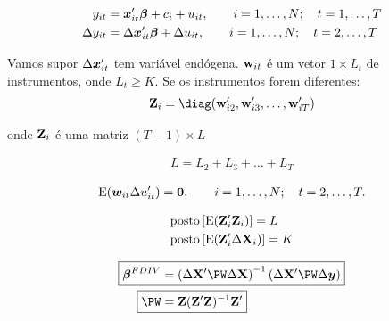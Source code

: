 \documentclass[11pt, oneside, a4paper, article]{article}
\numberwithin{equation}{section}
\begin{document}
\begin{description}
\vspace{-2 em}
\begin{align*}
y_{it} &= \boldsymbol{x}_{it}' \boldsymbol{\beta} + c_{i} + u_{it}, 
\qquad i = 1, \dots, N; \quad t = 1, \dots, T
\\
\Delta y_{it} &= \Delta \boldsymbol{x}_{it}' \boldsymbol{\beta} + \Delta u_{it},
\qquad i = 1, \dots, N; \quad t = 2, \dots, T
\end{align*}

Vamos supor $\Delta \boldsymbol{x}_{it}'$ tem variável endógena.
$\mathbf{w}_{it}$ é um vetor $1 \times L_{t}$ de instrumentos, onde $L_{t} \geq K$.
Se os instrumentos forem diferentes:
\begin{align*}
\Wmat_{i} = \diag( \wvec_{i2}', \wvec_{i3}', \dots, \wvec_{iT}')
\end{align*}

\noindent
onde $\mathbf{Z}_{i}$ é uma matriz $( T - 1 ) \times L$

\vspace{-1 em}
\begin{align*}
L = L_{2} + L_{3} + \dots + L_{T}
\end{align*}

\begin{hypo}
\begin{align*}
\text{E}( \boldsymbol{w}_{it} \Delta u_{it}') = \boldsymbol{0}, \qquad
i = 1, \dots, N; \quad t = 2, \dots, T.
\end{align*}
\end{hypo}

\begin{hypo}
\begin{align*}
&\text{posto}\left[ \text{E}( \mathbf{Z}_{i}' \mathbf{Z}_{i} ) \right] = L
\\
&\text{posto}\left[ \text{E}( \mathbf{Z}_{i}' \Delta \mathbf{X}_{i} ) \right] = K
\end{align*}
\end{hypo}

\vspace{-1 em}
\begin{align*}
\Aboxed{ \betavec^{FDIV} &=
\left( \Delta \Xmat' \PW \Delta \Xmat  \right)^{-1}
\left( \Delta \Xmat' \PW \Delta \yvec \right) }
\\
\Aboxed{\PW &= \Wmat (\Wmat' \Wmat)^{-1} \Wmat'}
\end{align*}


\end{description}
\end{document}
